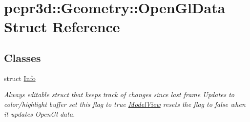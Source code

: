 \hypertarget{structpepr3d_1_1_geometry_1_1_open_gl_data}{}\section{pepr3d\+::Geometry\+::Open\+Gl\+Data Struct Reference}
\label{structpepr3d_1_1_geometry_1_1_open_gl_data}
\subsection*{Classes}
\begin{DoxyCompactItemize}
\item 
struct \mbox{\hyperlink{structpepr3d_1_1_geometry_1_1_open_gl_data_1_1_info}{Info}}
\begin{DoxyCompactList}\small\item\em Always editable struct that keeps track of changes since last frame Updates to color/highlight buffer set this flag to true \mbox{\hyperlink{classpepr3d_1_1_model_view}{Model\+View}} resets the flag to false when it updates Open\+Gl data. \end{DoxyCompactList}\end{DoxyCompactItemize}
